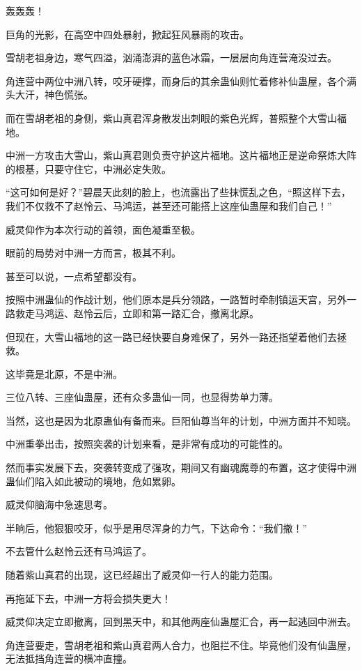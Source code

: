 
\begin{this_body}

轰轰轰！

巨角的光影，在高空中四处暴射，掀起狂风暴雨的攻击。

雪胡老祖身边，寒气四溢，汹涌澎湃的蓝色冰霜，一层层向角连营淹没过去。

角连营中两位中洲八转，咬牙硬撑，而身后的其余蛊仙则忙着修补仙蛊屋，各个满头大汗，神色慌张。

而在雪胡老祖的身侧，紫山真君浑身散发出刺眼的紫色光辉，普照整个大雪山福地。

中洲一方攻击大雪山，紫山真君则负责守护这片福地。这片福地正是逆命祭炼大阵的根基，只要守住它，中洲必定失败。

“这可如何是好？”碧晨天此刻的脸上，也流露出了些抹慌乱之色，“照这样下去，我们不仅救不了赵怜云、马鸿运，甚至还可能搭上这座仙蛊屋和我们自己！”

威灵仰作为本次行动的首领，面色凝重至极。

眼前的局势对中洲一方而言，极其不利。

甚至可以说，一点希望都没有。

按照中洲蛊仙的作战计划，他们原本是兵分领路，一路暂时牵制镇运天宫，另外一路救走马鸿运、赵怜云后，立即和第一路汇合，撤离北原。

但现在，大雪山福地的这一路已经快要自身难保了，另外一路还指望着他们去拯救。

这毕竟是北原，不是中洲。

三位八转、三座仙蛊屋，还有众多蛊仙一同，也显得势单力薄。

当然，这也是因为北原蛊仙有备而来。巨阳仙尊当年的计划，中洲方面并不知晓。

中洲重拳出击，按照突袭的计划来看，是非常有成功的可能性的。

然而事实发展下去，突袭转变成了强攻，期间又有幽魂魔尊的布置，这才使得中洲蛊仙们陷入如此被动的境地，危如累卵。

威灵仰脑海中急速思考。

半晌后，他狠狠咬牙，似乎是用尽浑身的力气，下达命令：“我们撤！”

不去管什么赵怜云还有马鸿运了。

随着紫山真君的出现，这已经超出了威灵仰一行人的能力范围。

再拖延下去，中洲一方将会损失更大！

威灵仰决定立即撤离，回到黑天中，和其他两座仙蛊屋汇合，再一起逃回中洲去。

角连营要走，雪胡老祖和紫山真君两人合力，也阻拦不住。毕竟他们没有仙蛊屋，无法抵挡角连营的横冲直撞。


\end{this_body}

